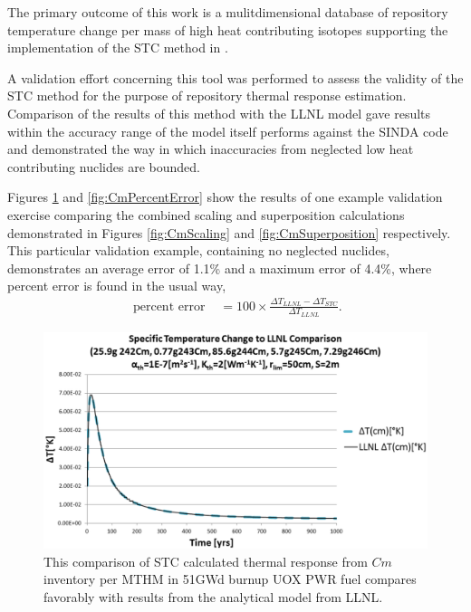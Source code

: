 
The primary outcome of this work is a mulitdimensional database of repository temperature 
change per mass of high heat contributing isotopes supporting the implementation 
of the \gls{STC} method in \Cyder. 

A validation effort concerning this tool was performed to assess the validity 
of the \gls{STC} method for the purpose of repository thermal response 
estimation.  Comparison of the results of this method with the \gls{LLNL} model 
\cite{greenberg_application_2012} gave results within the accuracy range of the 
model itself performs against the SINDA code \cite{huff_numerical_2012} and 
demonstrated the way in which inaccuracies from neglected low heat contributing 
nuclides are bounded. 

Figures \ref{fig:CmValidation} and \ref{fig:CmPercentError} show the results of 
one example validation exercise comparing the combined scaling and  
superposition calculations demonstrated in Figures \ref{fig:CmScaling} and 
\ref{fig:CmSuperposition} respectively. This particular validation example, 
containing no neglected nuclides, demonstrates an average error of 1.1\% and a 
maximum error of 4.4\%, where percent error is found in the usual way,
\begin{align}
\mbox{ percent error } &= 100\times\frac{\Delta T_{LLNL} - \Delta T_{STC}}{ \Delta T_{LLNL}}.
\end{align}

\begin{figure}[htp!]
\begin{center}
\includegraphics[width=\columnwidth]{./chapters/methodology/thermal_models/CmValidation.eps}
\end{center}
\caption{This comparison of \gls{STC} calculated thermal response from $Cm$ 
inventory per MTHM in 51GWd burnup UOX PWR fuel compares favorably with results 
from the analytical model from LLNL.} 
\label{fig:CmValidation}
\end{figure}


